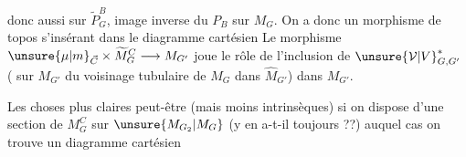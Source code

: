 donc aussi sur $\widetilde P_G^B$, image inverse du  $P_B$ sur $M_G$.
On a donc un  morphisme de topos
s'insérant dans le diagramme cartésien
Le  morphisme $\unsure{\mu|m}_{\vec C}\times\widetilde M_G^C\longrightarrow M_{G'}$ joue le rôle de l'inclusion de $\unsure{\mathcal V|V}_{G,G'}^*$  ( sur $M_{G'}$ du voisinage tubulaire de $M_G$ dans $\widehat M_{G'}$) dans $M_{G'}$.

Les choses  plus claires peut-être (mais moins intrinsèques) si on dispose d'une section de $M_G^C$ sur $\unsure{M_{G_2}|M_G}$ (y en a-t-il toujours ??) auquel cas on trouve un diagramme cartésien
